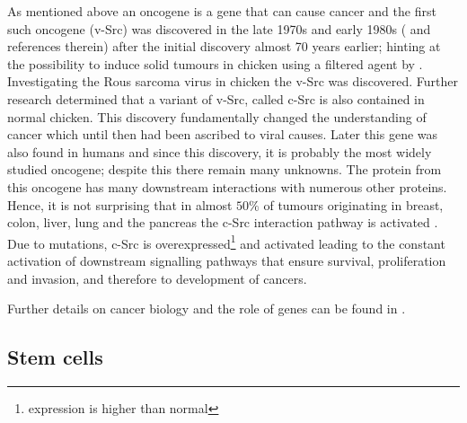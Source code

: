 As mentioned above an oncogene is a gene that can cause cancer and the first such oncogene (v-Src) was discovered in the late 1970s and early 1980s (\cite{Martin:2001jx} and references therein) after the initial discovery almost 70 years earlier; hinting at the possibility to induce solid tumours in chicken using a filtered agent by \cite{Rous:1911uf}. Investigating the Rous sarcoma virus in chicken the v-Src was discovered. Further research determined that a variant of v-Src, called c-Src is also contained in normal chicken. This discovery  fundamentally changed the understanding of cancer which until then had been ascribed to  viral causes. Later this gene was also found in humans and since this discovery, it is probably the most widely studied oncogene; despite this there remain many unknowns. The protein from this oncogene has many downstream interactions with numerous other proteins. Hence, it is not surprising that in almost $50\%$ of tumours originating in breast, colon, liver, lung and the pancreas the c-Src interaction pathway is activated \cite{Dehm:2013fr}. Due to mutations, c-Src is overexpressed\footnote{expression is higher than normal} and activated leading to the constant activation of downstream signalling pathways that ensure survival, proliferation and invasion, and therefore to development of cancers.

Further details on cancer biology and the role of genes can be found in \cite{Weinberg:2013uu}.

\subsection{Stem cells}
\label{sec:stem-cells}

